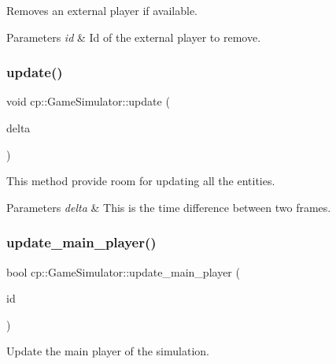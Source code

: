 Removes an external player if available. 


\begin{DoxyParams}{Parameters}
{\em id} & Id of the external player to remove. \\
\hline
\end{DoxyParams}
\mbox{\label{classcp_1_1_game_simulator_a6a0cd908ab20a8b776620f168846730c}} 
\subsubsection{\texorpdfstring{update()}{update()}}
{\footnotesize\ttfamily void cp\+::\+Game\+Simulator\+::update (\begin{DoxyParamCaption}\item[{float}]{delta }\end{DoxyParamCaption})}



This method provide room for updating all the entities. 


\begin{DoxyParams}{Parameters}
{\em delta} & This is the time difference between two frames. \\
\hline
\end{DoxyParams}
\mbox{\label{classcp_1_1_game_simulator_a04e844bdf85698a60c978d173116e1e0}} 
\subsubsection{\texorpdfstring{update\+\_\+main\+\_\+player()}{update\_main\_player()}}
{\footnotesize\ttfamily bool cp\+::\+Game\+Simulator\+::update\+\_\+main\+\_\+player (\begin{DoxyParamCaption}\item[{ID}]{id }\end{DoxyParamCaption})\hspace{0.3cm}{\ttfamily [inline]}}



Update the main player of the simulation. 


